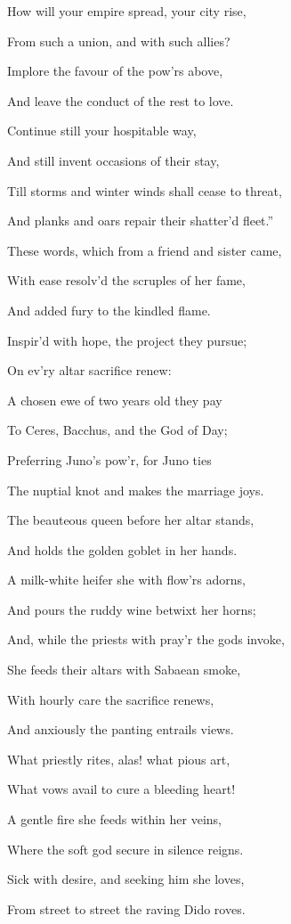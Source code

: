 How will your empire spread, your city rise,

From such a union, and with such allies?

Implore the favour of the pow’rs above,

And leave the conduct of the rest to love.

Continue still your hospitable way,

And still invent occasions of their stay,

Till storms and winter winds shall cease to threat,

And planks and oars repair their shatter’d fleet.”

These words, which from a friend and sister came,

With ease resolv’d the scruples of her fame,

And added fury to the kindled flame.

Inspir’d with hope, the project they pursue;

On ev’ry altar sacrifice renew:

A chosen ewe of two years old they pay

To Ceres, Bacchus, and the God of Day;

Preferring Juno’s pow’r, for Juno ties

The nuptial knot and makes the marriage joys.

The beauteous queen before her altar stands,

And holds the golden goblet in her hands.

A milk-white heifer she with flow’rs adorns,

And pours the ruddy wine betwixt her horns;

And, while the priests with pray’r the gods invoke,

She feeds their altars with Sabaean smoke,

With hourly care the sacrifice renews,

And anxiously the panting entrails views.

What priestly rites, alas! what pious art,

What vows avail to cure a bleeding heart!

A gentle fire she feeds within her veins,

Where the soft god secure in silence reigns.

Sick with desire, and seeking him she loves,

From street to street the raving Dido roves.

